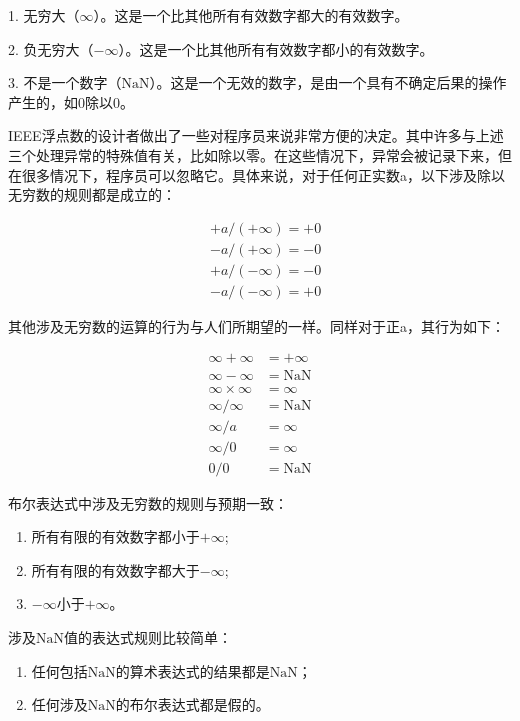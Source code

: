 \documentclass[lang=cn,12pt]{elegantbook}
\begin{document}
1. 无穷大（$\infty$）。这是一个比其他所有有效数字都大的有效数字。

2. 负无穷大（$-\infty$）。这是一个比其他所有有效数字都小的有效数字。

3. 不是一个数字（$\mathrm{NaN}$）。这是一个无效的数字，是由一个具有不确定后果的操作产生的，如0除以0。

IEEE浮点数的设计者做出了一些对程序员来说非常方便的决定。其中许多与上述三个处理异常的特殊值有关，比如除以零。在这些情况下，异常会被记录下来，但在很多情况下，程序员可以忽略它。具体来说，对于任何正实数a，以下涉及除以无穷数的规则都是成立的：

\[
  \begin{aligned}
  &+a /(+\infty)=+0 \\
  &-a /(+\infty)=-0 \\
  &+a /(-\infty)=-0 \\
  &-a /(-\infty)=+0
  \end{aligned}
\]

其他涉及无穷数的运算的行为与人们所期望的一样。同样对于正a，其行为如下：

\[
  \begin{aligned}
  \infty+\infty &=+\infty \\
  \infty-\infty &=\mathrm{NaN} \\
  \infty \times \infty &=\infty \\
  \infty / \infty &=\mathrm{NaN} \\
  \infty / a &=\infty \\
  \infty / 0 &=\infty \\
  0 / 0 &=\mathrm{NaN}
  \end{aligned}
\]

布尔表达式中涉及无穷数的规则与预期一致：

\begin{enumerate}
  \item 所有有限的有效数字都小于$+\infty$;
  \item 所有有限的有效数字都大于$-\infty$;
  \item $-\infty$小于$+\infty$。
\end{enumerate}

涉及$\mathrm{NaN}$值的表达式规则比较简单：

\begin{enumerate}
  \item 任何包括$\mathrm{NaN}$的算术表达式的结果都是$\mathrm{NaN}$；
  \item 任何涉及$\mathrm{NaN}$的布尔表达式都是假的。
\end{enumerate}
\end{document}
